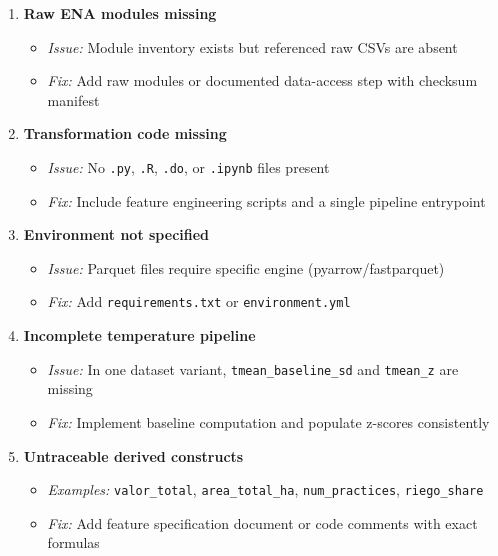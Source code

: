 \documentclass[11pt,a4paper]{article}
\begin{document}
\begin{enumerate}[leftmargin=1.5em]
    \item \textbf{Raw ENA modules missing}
    \begin{itemize}
        \item \textit{Issue:} Module inventory exists but referenced raw CSVs are absent
        \item \textit{Fix:} Add raw modules or documented data-access step with checksum manifest
    \end{itemize}
    
    \item \textbf{Transformation code missing}
    \begin{itemize}
        \item \textit{Issue:} No \texttt{.py}, \texttt{.R}, \texttt{.do}, or \texttt{.ipynb} files present
        \item \textit{Fix:} Include feature engineering scripts and a single pipeline entrypoint
    \end{itemize}
    
    \item \textbf{Environment not specified}
    \begin{itemize}
        \item \textit{Issue:} Parquet files require specific engine (pyarrow/fastparquet)
        \item \textit{Fix:} Add \texttt{requirements.txt} or \texttt{environment.yml}
    \end{itemize}
    
    \item \textbf{Incomplete temperature pipeline}
    \begin{itemize}
        \item \textit{Issue:} In one dataset variant, \texttt{tmean\_baseline\_sd} and \texttt{tmean\_z} are missing
        \item \textit{Fix:} Implement baseline computation and populate z-scores consistently
    \end{itemize}
    
    \item \textbf{Untraceable derived constructs}
    \begin{itemize}
        \item \textit{Examples:} \texttt{valor\_total}, \texttt{area\_total\_ha}, \texttt{num\_practices}, \texttt{riego\_share}
        \item \textit{Fix:} Add feature specification document or code comments with exact formulas
    \end{itemize}
\end{enumerate}
\end{document}
